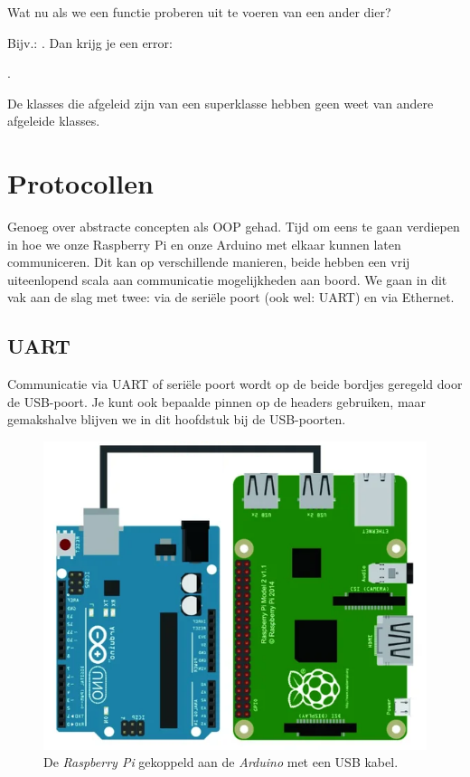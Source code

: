 \begin{remark}
  Wat nu als we een functie proberen uit te voeren van een ander dier? 
  
  Bijv.: . Dan krijg je een error: 
  
  .
  
  De klasses die afgeleid zijn van een superklasse hebben geen weet van andere afgeleide klasses.
\end{remark}

\newpage

\section{Protocollen}
Genoeg over abstracte concepten als OOP gehad. Tijd om eens te gaan verdiepen in hoe we onze Raspberry Pi en onze Arduino met elkaar kunnen laten communiceren. Dit kan op verschillende manieren, beide hebben een vrij uiteenlopend scala aan communicatie mogelijkheden aan boord. We gaan in dit vak aan de slag met twee: via de seriële poort (ook wel: UART) en via Ethernet.

\subsection{UART}
Communicatie via UART of seriële poort wordt op de beide bordjes geregeld door de USB-poort. Je kunt ook bepaalde pinnen op de headers gebruiken, maar gemakshalve blijven we in dit hoofdstuk bij de USB-poorten.

\begin{figure}[h!]
\centering\includegraphics[scale=0.5]{Pictures/chapter08/usb.png}
  \caption{\small De \textit{Raspberry Pi} gekoppeld aan de \textit{Arduino} met een USB kabel.} 
\label{fig:usb} %
\end{figure}

